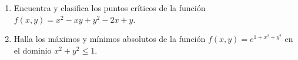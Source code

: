 \documentclass[12pt]{article}
\begin{document}
\bigskip

            
\bigskip
\bigskip
\bigskip






\begin{enumerate}

\item Encuentra y clasifica los puntos cr\'iticos de la funci\'on $f(x,y)=x^2-xy+y^2-2x+y$.


  \vspace{8cm}


\item  Halla los m\'aximos y m\'inimos absolutos de la funci\'on $f(x,y)=e^{1+x^2+y^2}$
en el dominio $x^2+y^2 \leq 1$.

  

\end{enumerate}
 





  
\end{document}
